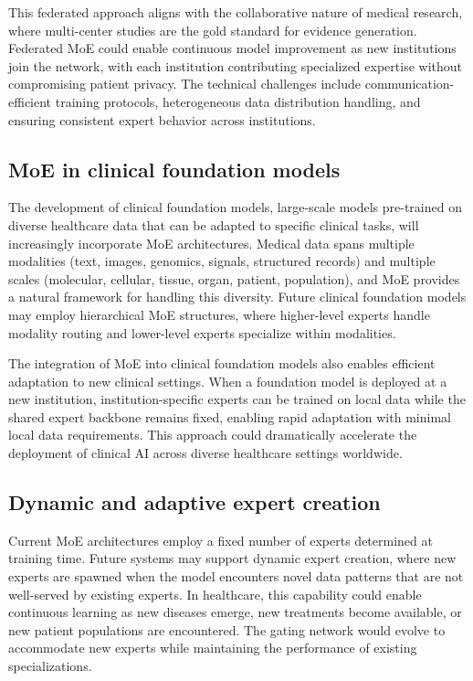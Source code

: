 This federated approach aligns with the collaborative nature of medical research, where multi-center studies are the gold standard for evidence generation. Federated MoE could enable continuous model improvement as new institutions join the network, with each institution contributing specialized expertise without compromising patient privacy. The technical challenges include communication-efficient training protocols, heterogeneous data distribution handling, and ensuring consistent expert behavior across institutions.

\subsection*{MoE in clinical foundation models}

The development of clinical foundation models, large-scale models pre-trained on diverse healthcare data that can be adapted to specific clinical tasks, will increasingly incorporate MoE architectures. Medical data spans multiple modalities (text, images, genomics, signals, structured records) and multiple scales (molecular, cellular, tissue, organ, patient, population), and MoE provides a natural framework for handling this diversity. Future clinical foundation models may employ hierarchical MoE structures, where higher-level experts handle modality routing and lower-level experts specialize within modalities.

The integration of MoE into clinical foundation models also enables efficient adaptation to new clinical settings. When a foundation model is deployed at a new institution, institution-specific experts can be trained on local data while the shared expert backbone remains fixed, enabling rapid adaptation with minimal local data requirements. This approach could dramatically accelerate the deployment of clinical AI across diverse healthcare settings worldwide.

\subsection*{Dynamic and adaptive expert creation}

Current MoE architectures employ a fixed number of experts determined at training time. Future systems may support dynamic expert creation, where new experts are spawned when the model encounters novel data patterns that are not well-served by existing experts. In healthcare, this capability could enable continuous learning as new diseases emerge, new treatments become available, or new patient populations are encountered. The gating network would evolve to accommodate new experts while maintaining the performance of existing specializations.

